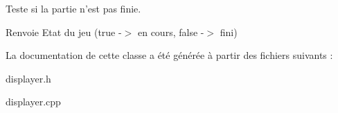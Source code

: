 Teste si la partie n'est pas finie. 

\begin{DoxyReturn}{Renvoie}
Etat du jeu (true -\/$>$ en cours, false -\/$>$ fini) 
\end{DoxyReturn}


La documentation de cette classe a été générée à partir des fichiers suivants \-:\begin{DoxyCompactItemize}
\item 
displayer.\-h\item 
displayer.\-cpp\end{DoxyCompactItemize}
